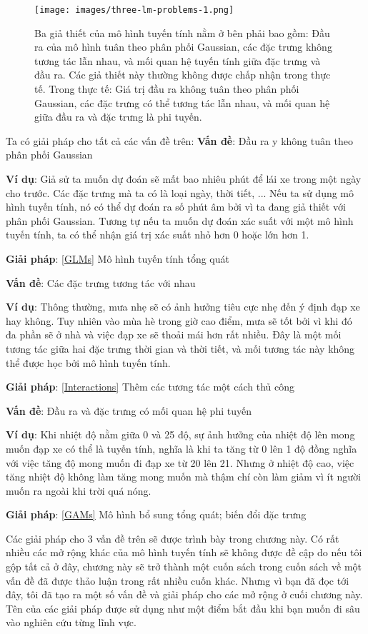 \begin{figure*}[h!]
	\centering
	\texttt{[image: images/three-lm-problems-1.png]}
	\label{fig:4_3}
	\caption{Ba giả thiết của mô hình tuyến tính nằm ở bên phải bao gồm: Đầu ra của mô hình tuân theo phân phối Gaussian, các đặc trưng không tương tác lẫn nhau, và mối quan hệ tuyến tính giữa đặc trưng và đầu ra. Các giả thiết này thường không được chấp nhận trong thực tế. Trong thực tế: Giá trị đầu ra không tuân theo phân phối Gaussian, các đặc trưng có thể tương tác lẫn nhau, và mối quan hệ giữa đầu ra và đặc trưng là phi tuyến. }
\end{figure*}
Ta có giải pháp cho tất cả các vấn đề trên: \textbf{Vấn đề}: Đầu ra y không tuân theo phân phối Gaussian

\textbf{Ví dụ}: Giả sử ta muốn dự đoán sẽ mất bao nhiêu phút để lái xe trong một ngày cho trước. Các đặc trưng mà ta có là loại ngày, thời tiết, ... Nếu ta sử dụng mô hình tuyến tính, nó có thể dự đoán ra số phút âm bởi vì ta đang giả thiết với phân phối Gaussian. Tương tự nếu ta muốn dự đoán xác suất với một mô hình tuyến tính, ta có thể nhận giá trị xác suất nhỏ hơn 0 hoặc lớn hơn 1.

\textbf{Giải pháp}: \ref{GLMs}{ Mô hình tuyến tính tổng quát}

\textbf{Vấn đề}: Các đặc trưng tương tác với nhau

\textbf{Ví dụ}: Thông thường, mưa nhẹ sẽ có ảnh hưởng tiêu cực nhẹ đến ý định đạp xe hay không. Tuy nhiên vào mùa hè trong giờ cao điểm, mưa sẽ tốt bởi vì khi đó đa phần sẽ ở nhà và việc đạp xe sẽ thoải mái hơn rất nhiều. Đây là một mối tương tác giữa hai đặc trưng thời gian và thời tiết, và mối tương tác này không thể được học bởi mô hình tuyến tính.

\textbf{Giải pháp}: \ref{Interactions}{ Thêm các tương tác một cách thủ công}

\textbf{Vấn đề}: Đầu ra và đặc trưng có mối quan hệ phi tuyến

\textbf{Ví dụ}: Khi nhiệt độ nằm giữa 0 và 25 độ, sự ảnh hưởng của nhiệt độ lên mong muốn đạp xe có thể là tuyến tính, nghĩa là khi ta tăng từ 0 lên 1 độ đồng nghĩa với việc tăng độ mong muốn đi đạp xe từ 20 lên 21. Nhưng ở nhiệt độ cao, việc tăng nhiệt độ không làm tăng mong muốn mà thậm chí còn làm giảm vì ít người muốn ra ngoài khi trời quá nóng.

\textbf{Giải pháp}: \ref{GAMs}{ Mô hình bổ sung tổng quát; biến đổi đặc trưng}

Các giải pháp cho 3 vấn đề trên sẽ được trình bày trong chương này. Có rất nhiều các mở rộng khác của mô hình tuyến tính sẽ không được đề cập do nếu tôi gộp tất cả ở đây, chương này sẽ trở thành một cuốn sách trong cuốn sách về một vấn đề đã được thảo luận trong rất nhiều cuốn khác. Nhưng vì bạn đã đọc tới đây, tôi đã tạo ra một số vấn đề và giải pháp cho các mở rộng ở cuối chương này. Tên của các giải pháp được sử dụng như một điểm bắt đầu khi bạn muốn đi sâu vào nghiên cứu từng lĩnh vực.


